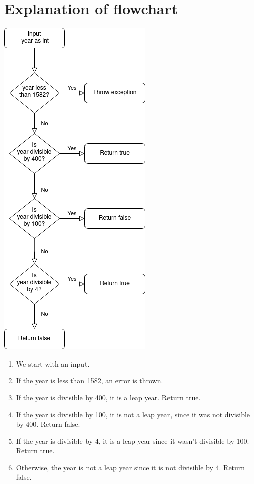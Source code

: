 \documentclass{apa7}
\begin{document}
    
\section*{Explanation of flowchart}
\includegraphics[scale=0.7]{figures/flowchart.png}

\begin{enumerate}
    \item We start with an input.
    \item If the year is less than 1582, an error is thrown.
    \item If the year is divisible by 400, it is a leap year. Return true.
    \item If the year is divisible by 100, it is not a leap year, since it was not divisible by 400. Return false.
    \item If the year is divisible by 4, it is a leap year since it wasn't divisible by 100. Return true.
    \item Otherwise, the year is not a leap year since it is not divisible by 4. Return false.
\end{enumerate}
\end{document}
